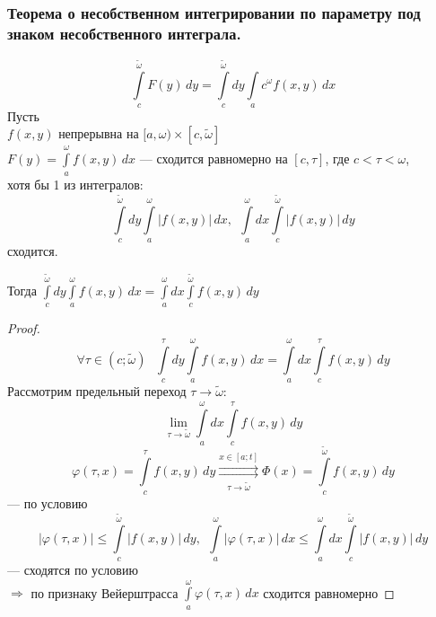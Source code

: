 \subsubsection{Теорема о несобственном интегрировании по параметру под знаком несобственного интеграла.}
\[ \int\limits_c^{\tilde \omega} F(y)\,dy = \int\limits_c^{\tilde \omega} dy \int\limits_ac^{\omega} f(x, y)\,dx \]
Пусть \\
\phantom{Пусть} $f(x, y)$ непрерывна на $[a, \omega) \times [c, \tilde \omega]$ \\
\phantom{Пусть} $F(y) = \int\limits_a^{\omega} f(x, y)\,dx$ --- сходится равномерно на $[c, \tau]$, 
где $c < \tau < \omega$, \\
\phantom{Пусть} хотя бы 1 из интегралов:
\[ \int\limits_c^{\tilde \omega} dy \int\limits_a^{\omega} |f(x, y)|\,dx, \ \ 
\int\limits_a^{\omega} dx \int\limits_c^{\tilde \omega} |f(x, y)|\,dy \]
\phantom{Пусть} сходится.

Тогда $\int\limits_c^{\tilde \omega} dy \int\limits_a^{\omega} f(x, y)\,dx = 
\int\limits_a^{\omega} dx \int\limits_c^{\tilde \omega} f(x, y)\,dy$
\begin{proof}
    \[ \forall \tau \in (c; \tilde \omega) \ \ \ \int\limits_c^{\tau} dy \int\limits_a^{\omega} f(x, y)\,dx = 
    \int\limits_a^{\omega} dx \int\limits_c^{\tau} f(x, y)\,dy \]
    Рассмотрим предельный переход $\tau \to \tilde \omega$:
    \[ \lim_{\tau \to \tilde \omega} \int\limits_a^{\omega} dx \int\limits_c^{\tau} f(x, y)\,dy \]
    \[ \varphi(\tau, x) = \int\limits_c^{\tau} f(x, y)\,dy \overset{x \in [a; t]}{\underset{\tau \to \tilde \omega}
    {\rightrightarrows}} \Phi(x) = \int\limits_c^{\tilde \omega} f(x, y)\,dy \]
    --- по условию
    \[ |\varphi(\tau, x)| \le \int\limits_c^{\tilde \omega} |f(x, y)|\,dy, \ \ \int\limits_a^{\omega} |\varphi(\tau, x)|\,dx
    \le \int\limits_a^{\omega} dx \int\limits_c^{\tilde \omega} |f(x, y)|\,dy \]
    --- сходятся по условию \\
    $\Rightarrow$ по признаку Вейерштрасса $\int\limits_a^{\omega} \varphi(\tau, x)\,dx$ сходится равномерно
\end{proof}
